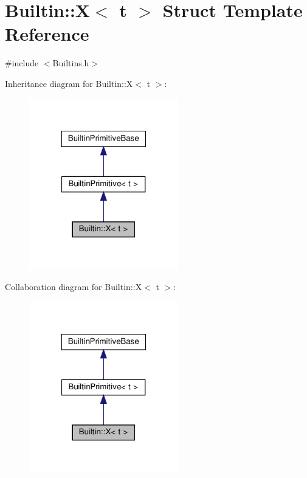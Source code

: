 \hypertarget{struct_builtin_1_1_x}{}\section{Builtin\+:\+:X$<$ t $>$ Struct Template Reference}
\label{struct_builtin_1_1_x}


{\ttfamily \#include $<$Builtins.\+h$>$}



Inheritance diagram for Builtin\+:\+:X$<$ t $>$\+:\nopagebreak
\begin{figure}[H]
\begin{center}
\leavevmode
\includegraphics[width=184pt]{struct_builtin_1_1_x__inherit__graph}
\end{center}
\end{figure}


Collaboration diagram for Builtin\+:\+:X$<$ t $>$\+:\nopagebreak
\begin{figure}[H]
\begin{center}
\leavevmode
\includegraphics[width=184pt]{struct_builtin_1_1_x__coll__graph}
\end{center}
\end{figure}
